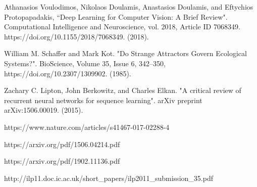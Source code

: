 \documentclass[letterpaper, 10 pt, conference]{ieeeconf}  %
\begin{document}
\begin{thebibliography}{99}
 Athanasios Voulodimos, Nikolaos Doulamis, Anastasios Doulamis, and Eftychios Protopapadakis, “Deep Learning for Computer Vision: A Brief Review". Computational Intelligence and Neuroscience, vol. 2018, Article ID 7068349. https://doi.org/10.1155/2018/7068349. (2018).

 William M. Schaffer and Mark Kot. "Do Strange Attractors Govern Ecological Systems?". BioScience, Volume 35, Issue 6, 342–350, https://doi.org/10.2307/1309902. (1985).

 Zachary C. Lipton, John Berkowitz, and Charles Elkan. "A critical review of recurrent neural networks for sequence learning". arXiv preprint arXiv:1506.00019. (2015).

https://www.nature.com/articles/s41467-017-02288-4

https://arxiv.org/pdf/1506.04214.pdf

https://arxiv.org/pdf/1902.11136.pdf

http://ilp11.doc.ic.ac.uk/short\_papers/ilp2011\_submission\_35.pdf

\end{thebibliography}
\end{document}

